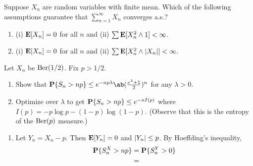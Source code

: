 \documentclass[12pt]{article}
\begin{document}
\begin{problem*}
    Suppose $X_n$ are \iid random variables with finite mean.
    Which of the following assumptions guarantee that $\sum_{n=1}^\infty X_n$
    converges a.s.?
    \begin{enumerate}
        \item (i) $\operatorname{\mathbf E}[X_n] = 0$ for all $n$ and
            (ii) $\sum \operatorname{\mathbf E}[X_n^2 \wedge 1] < \infty$.
        \item (i) $\operatorname{\mathbf E}[X_n] = 0$ for all $n$ and
            (ii) $\sum \operatorname{\mathbf E}[X_n^2 \wedge \lvert X_n\rvert] < \infty$.
    \end{enumerate}
\end{problem*}

\begin{problem*}
    Let $X_n$ be \iid $\operatorname{Ber}(1/2)$.
    Fix $p > 1/2$.
    \begin{enumerate}
        \item Show that
        $\P\set{S_n > np} \le e^{-np\lambda}\ab(\frac{e^\lambda+1}{2})^n$
        for any $\lambda > 0$.
        \item Optimize over $\lambda$ to get $\operatorname{\mathbf P}\{S_n > np\} \le e^{-nI(p)}$
        where $I(p) = -p\log p - (1-p)\log(1-p)$.
        (Observe that this is the entropy of the $\operatorname{Ber}(p)$ measure.)
    \end{enumerate}
\end{problem*}
\begin{solution} \leavevmode
    \begin{enumerate}
        \item Let $Y_n = X_n - p$.
        Then $\operatorname{\mathbf E}[Y_n] = 0$ and $\lvert Y_n\rvert \le p$.
        By Hoeffding's inequality, \begin{align*}
            \operatorname{\mathbf P}\{S_n^X > np\} &= \operatorname{\mathbf P}\{S_n^Y > 0\} \\
                &= 
        \end{align*}
    \end{enumerate}
\end{solution}
\end{document}
